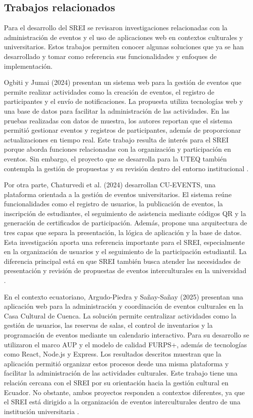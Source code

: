 \subsection{Trabajos relacionados}

Para el desarrollo del SREI se revisaron investigaciones relacionadas con la administración de eventos y el uso de aplicaciones web en contextos culturales y universitarios. Estos trabajos permiten conocer algunas soluciones que ya se han desarrollado y tomar como referencia sus funcionalidades y enfoques de implementación.

Ogbiti y Jumai (2024) presentan un sistema web para la gestión de eventos que permite realizar actividades como la creación de eventos, el registro de participantes y el envío de notificaciones. La propuesta utiliza tecnologías web y una base de datos para facilitar la administración de las actividades. En las pruebas realizadas con datos de muestra, los autores reportan que el sistema permitió gestionar eventos y registros de participantes, además de proporcionar actualizaciones en tiempo real. Este trabajo resulta de interés para el SREI porque aborda funciones relacionadas con la organización y participación en eventos. Sin embargo, el proyecto que se desarrolla para la UTEQ también contempla la gestión de propuestas y su revisión dentro del entorno institucional \cite{ogbiti2024}.

Por otra parte, Chaturvedi et al. (2024) desarrollan CU-EVENTS, una plataforma orientada a la gestión de eventos universitarios. El sistema reúne funcionalidades como el registro de usuarios, la publicación de eventos, la inscripción de estudiantes, el seguimiento de asistencia mediante códigos QR y la generación de certificados de participación. Además, propone una arquitectura de tres capas que separa la presentación, la lógica de aplicación y la base de datos. Esta investigación aporta una referencia importante para el SREI, especialmente en la organización de usuarios y el seguimiento de la participación estudiantil. La diferencia principal está en que SREI también busca atender las necesidades de presentación y revisión de propuestas de eventos interculturales en la universidad \cite{chaturvedi2024}.

En el contexto ecuatoriano, Argudo-Piedra y Sañay-Sañay (2025) presentan una aplicación web para la administración y coordinación de eventos culturales en la Casa Cultural de Cuenca. La solución permite centralizar actividades como la gestión de usuarios, las reservas de salas, el control de inventarios y la programación de eventos mediante un calendario interactivo. Para su desarrollo se utilizaron el marco AUP y el modelo de calidad FURPS+, además de tecnologías como React, Node.js y Express. Los resultados descritos muestran que la aplicación permitió organizar estos procesos desde una misma plataforma y facilitar la administración de las actividades culturales. Este trabajo tiene una relación cercana con el SREI por su orientación hacia la gestión cultural en Ecuador. No obstante, ambos proyectos responden a contextos diferentes, ya que el SREI está dirigido a la organización de eventos interculturales dentro de una institución universitaria \cite{argudo2025}.

